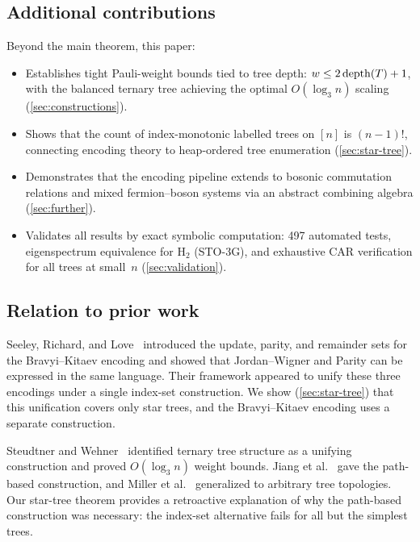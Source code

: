 \subsection{Additional contributions}

Beyond the main theorem, this paper:
\begin{itemize}
  \item Establishes tight Pauli-weight bounds tied to tree depth:
    $w \le 2\,\mathrm{depth}(T) + 1$, with the balanced ternary tree achieving
    the optimal $O(\log_3 n)$ scaling (\cref{sec:constructions}).

  \item Shows that the count of index-monotonic labelled trees on $[n]$
    is $(n{-}1)!$, connecting encoding theory to heap-ordered tree
    enumeration (\cref{sec:star-tree}).

  \item Demonstrates that the encoding pipeline extends to bosonic
    commutation relations and mixed fermion--boson systems via an
    abstract combining algebra (\cref{sec:further}).

  \item Validates all results by exact symbolic computation: 497
    automated tests, eigenspectrum equivalence for H$_2$ (STO-3G),
    and exhaustive CAR verification for all trees at small~$n$
    (\cref{sec:validation}).
\end{itemize}

\subsection{Relation to prior work}

Seeley, Richard, and Love~\cite{seeley2012} introduced the update,
parity, and remainder sets for the Bravyi--Kitaev encoding and showed
that Jordan--Wigner and Parity can be expressed in the same language.
Their framework appeared to unify these three encodings under a single
index-set construction.  We show (\cref{sec:star-tree}) that this
unification covers only star trees, and the Bravyi--Kitaev encoding
uses a separate construction.

Steudtner and Wehner~\cite{steudtner2018} identified ternary tree
structure as a unifying construction and proved $O(\log_3 n)$ weight
bounds.  Jiang et al.~\cite{jiang2020} gave the path-based
construction, and Miller et al.~\cite{miller2023bonsai} generalized to
arbitrary tree topologies.  Our star-tree theorem provides a
retroactive explanation of why the path-based construction was
necessary: the index-set alternative fails for all but the simplest
trees.


